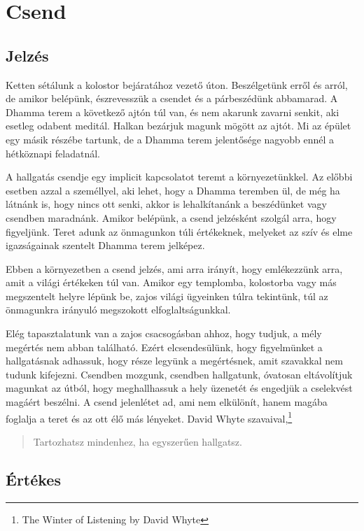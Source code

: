 \chapter{Csend}

\section{Jelzés}

Ketten sétálunk a kolostor bejáratához vezető úton. Beszélgetünk erről
és arról, de amikor belépünk, észrevesszük a csendet és a párbeszédünk
abbamarad. A Dhamma terem a következő ajtón túl van, és nem akarunk
zavarni senkit, aki esetleg odabent meditál. Halkan bezárjuk magunk
mögött az ajtót. Mi az épület egy másik részébe tartunk, de a Dhamma
terem jelentősége nagyobb ennél a hétköznapi feladatnál.

A hallgatás csendje egy implicit kapcsolatot teremt a környezetünkkel.
Az előbbi esetben azzal a személlyel, aki lehet, hogy a Dhamma teremben
ül, de még ha látnánk is, hogy nincs ott senki, akkor is lehalkítanánk a
beszédünket vagy csendben maradnánk. Amikor belépünk, a csend jelzésként
szolgál arra, hogy figyeljünk. Teret adunk az önmagunkon túli
értékeknek, melyeket az szív és elme igazságainak szentelt Dhamma terem
jelképez.

Ebben a környezetben a csend jelzés, ami arra irányít, hogy emlékezzünk
arra, amit a világi értékeken túl van. Amikor egy templomba, kolostorba
vagy más megszentelt helyre lépünk be, zajos világi ügyeinken túlra
tekintünk, túl az önmagunkra irányuló megszokott elfoglaltságunkkal.

Elég tapasztalatunk van a zajos csacsogásban ahhoz, hogy tudjuk, a mély
megértés nem abban található. Ezért elcsendesülünk, hogy figyelmünket a
hallgatásnak adhassuk, hogy része legyünk a megértésnek, amit szavakkal
nem tudunk kifejezni. Csendben mozgunk, csendben hallgatunk, óvatosan
eltávolítjuk magunkat az útból, hogy meghallhassuk a hely üzenetét és
engedjük a cselekvést magáért beszélni. A csend jelenlétet ad, ami nem
elkülönít, hanem magába foglalja a teret és az ott élő más lényeket.
David Whyte szavaival,\footnote{The Winter of Listening by David Whyte}

\begin{quote}
Tartozhatsz mindenhez, ha egyszerűen hallgatsz.
\end{quote}

\section{Értékes}

